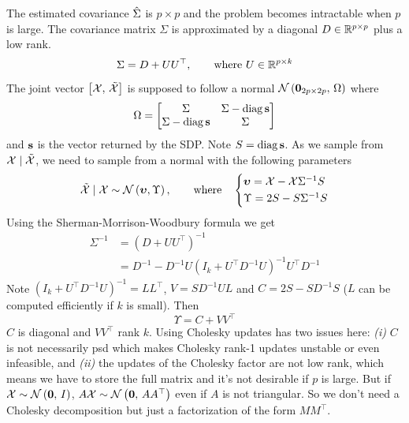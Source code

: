 The estimated covariance $\hat{\Sigma}$ is $p \times p$ and the problem becomes intractable when $p$ is large.
The covariance matrix $\Sigma$ is approximated by a diagonal $D \in \mathbb{R}^{p \times p}$ plus a low rank.
\begin{equation*}
    \Sigma = D + UU^\top,
    \qquad
    \text{where }
    U \in \mathbb{R}^{p \times k}
\end{equation*}
The joint vector $\big[ \mathcal{X},\, \tilde{\mathcal{X}} \big]$ is supposed to follow a normal
$\mathcal{N}\left( \mathbf{0}_{2p \times 2p},\, \Omega \right)$
where
\begin{equation*}
    \Omega = \begin{bmatrix}
                 \Sigma & \Sigma - \operatorname*{diag} \mathbf{s}\\
                 \Sigma - \operatorname*{diag} \mathbf{s} & \Sigma
    \end{bmatrix}
\end{equation*}
and $\mathbf{s}$ is the vector returned by the SDP\@.
Note $S = \operatorname*{diag}\mathbf{s}$.
As we sample from $\mathcal{X} \mid \tilde{\mathcal{X}}$,
we need to sample from a normal with the following parameters
\begin{equation*}
    \tcX \mid \cX \sim \cN\left( \bupsilon, \Upsilon \right)
    ,\qquad\text{where}\quad
    \begin{cases*}
        \bupsilon = \cX - \cX\Sigma^{-1}S\\
        \Upsilon = 2S - S\Sigma^{-1}S
    \end{cases*}
\end{equation*}
Using the Sherman-Morrison-Woodbury formula we get
\begin{align*}
    \Sigma^{-1} &= (D + UU^\top)^{-1}\\
    &= D^{-1} - D^{-1}U(I_k + U^\top D^{-1}U)^{-1}U^\top D^{-1}
\end{align*}
Note $(I_k + U^\top D^{-1}U)^{-1} = LL^\top$, $V = SD^{-1}UL$ and $C = 2S - SD^{-1}S$
($L$ can be computed efficiently if $k$ is small).
Then
\begin{equation*}
    \Upsilon = C + VV^\top
\end{equation*}
$C$ is diagonal and $VV^\top$ rank $k$.
Using Cholesky updates has two issues here:
\textit{(i)} $C$ is not necessarily psd which makes Cholesky rank-1 updates unstable or even infeasible,
and \textit{(ii)} the updates of the Cholesky factor are not low rank,
which means we have to store the full matrix and it's not desirable if $p$ is large.
But if $\mathcal{X} \sim \mathcal{N}\left( \mathbf{0},\, I \right)$,
$A\mathcal{X} \sim \mathcal{N}\left( \mathbf{0},\, AA^\top \right)$ even if $A$ is not triangular.
So we don't need a Cholesky decomposition but just a factorization of the form $MM^\top$.

